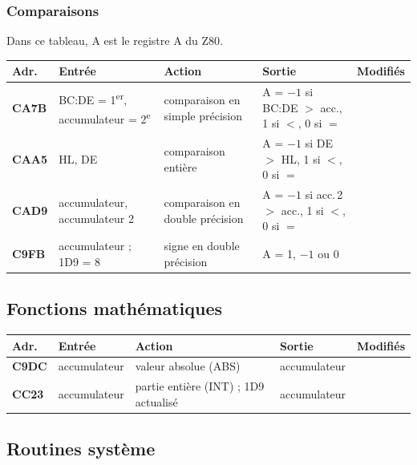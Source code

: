 \documentclass[a4paper,10pt]{article}
\makeatletter
\newcommand{\reg}[1]{\textsf{#1}}
\newenvironment{routines}
  {\small\begin{longtable}{@{}>{\ttfamily\bfseries}p{1.1cm}>{\raggedright}p{4.0cm}>{\raggedright}p{5.0cm}>{\raggedright}p{3.1cm}>{\raggedright\arraybackslash}p{2.1cm}@{}}
   \toprule
   \normalfont\bfseries Adr. & \textbf{Entrée} & \textbf{Action} & \textbf{Sortie} & \textbf{Modifiés}\\
   \midrule\endhead
   \bottomrule\endfoot}
  {\end{longtable}}
\makeatother
\begin{document}
\subsubsection*{Comparaisons}
Dans ce tableau, A est le registre \reg{A} du Z80.
\begin{routines}
CA7B & BC\string:DE = 1\textsuperscript{er}, accumulateur = 2\textsuperscript{e} & comparaison en simple précision & A = $-1$ si BC\string:DE $>$ acc., 1 si $<$, 0 si $=$ & \\
CAA5 & HL, DE & comparaison entière & A = $-1$ si DE $>$ HL, 1 si $<$, 0 si $=$ & \\
CAD9 & accumulateur, accumulateur 2 & comparaison en double précision & A = $-1$ si acc.\,2 $>$ acc., 1 si $<$, 0 si $=$ & \\
C9FB & accumulateur ; 1D9 = 8 & signe en double précision & A = 1, $-1$ ou 0 & \\
\end{routines}

\subsection{Fonctions mathématiques}
\begin{routines}
C9DC & accumulateur & valeur absolue (ABS) & accumulateur & \\
CC23 & accumulateur & partie entière (INT) ; 1D9 actualisé & accumulateur & \\
\end{routines}

\subsection{Routines système}
\end{document}
